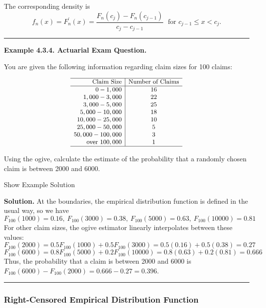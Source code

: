 \documentclass[]{book}
\theoremstyle{definition}
\theoremstyle{definition}
\theoremstyle{definition}
\theoremstyle{remark}
\begin{document}
The corresponding density is
\[f_n(x) = F^{\prime}_n(x) = \frac{F_n(c_j)-F_n(c_{j-1})}{c_j - c_{j-1}} \ \ \  \text{for } c_{j-1} \le x < c_j .\]

\begin{center}\rule{0.5\linewidth}{\linethickness}\end{center}

\textbf{Example 4.3.4. Actuarial Exam Question.}

You are given the following information regarding claim sizes for 100
claims:

\[
{\small
\begin{array}{r|c}
\hline
\text{Claim Size} &  \text{Number of Claims} \\
\hline
0 - 1,000 & 16 \\
1,000 - 3,000 & 22 \\
3,000 - 5,000 & 25 \\
5,000 - 10,000 & 18 \\
10,000 - 25,000 & 10 \\
25,000 - 50,000 & 5 \\
50,000 - 100,000 & 3 \\
\text{over  } 100,000 & 1 \\
\hline
\end{array}
}
\]

Using the ogive, calculate the estimate of the probability that a
randomly chosen claim is between 2000 and 6000.

Show Example Solution

\hypertarget{toggleExampleSelect.3.4}{}
\textbf{Solution.} At the boundaries, the empirical distribution
function is defined in the usual way, so we have
\[F_{100}(1000) = 0.16, \ F_{100}(3000)=0.38, \ F_{100}(5000)=0.63, \ F_{100}(10000)=0.81\]
For other claim sizes, the ogive estimator linearly interpolates between
these values:
\[F_{100}(2000) = 0.5F_{100}(1000) + 0.5F_{100}(3000) = 0.5(0.16)+0.5(0.38)=0.27\]
\[F_{100}(6000)=0.8F_{100}(5000)+0.2F_{100}(10000) = 0.8(0.63)+0.2(0.81)=0.666\]
Thus, the probability that a claim is between 2000 and 6000 is
\(F_{100}(6000) - F_{100}(2000) = 0.666-0.27 = 0.396\).

\begin{center}\rule{0.5\linewidth}{\linethickness}\end{center}

\subsubsection{Right-Censored Empirical Distribution
Function}\label{right-censored-empirical-distribution-function}
\end{document}

